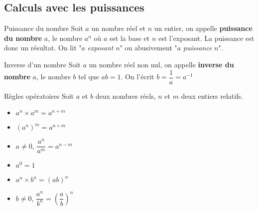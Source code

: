 \begin{pageCours} %


\section{Calculs avec les puissances}

\begin{DefT}{Puissance du nombre}
Soit $a$ un nombre réel et $n$ un entier, on appelle \textbf{puissance du nombre} $a$, le nombre $a^n$ où $a$ est la base et $n$ est l'exposant. La puissance est donc un résultat. On lit "$a$ \textit{exposant} $n$" ou abusivement "$a$ \textit{puissance} $n$".
\end{DefT}


\begin{DefT}{Inverse d'un nombre}
Soit $a$ un nombre réel non nul, on appelle \textbf{inverse du nombre} $a$, le nombre $b$ tel que $ab=1$. On l'écrit $b=\dfrac{1}{a}=a^{-1}$
\end{DefT}





\begin{ThT}{Règles opératoires}
Soit $a$ et $b$ deux nombres réels, $n$ et $m$ deux entiers relatifs.


\begin{minipage}{0.33\linewidth}
\begin{itemize}
\item $a^n \times a^m = a^{n+m}$ 
\item $\left(a^n \right)^m =a^{n\times m}$ 

\end{itemize}
\end{minipage}
\begin{minipage}{0.33\linewidth}
\begin{itemize}
\item $a \neq 0$, $\dfrac{a^n}{a^m} = a^{n-m} $ 
\item $a^0=1 $
 
\end{itemize}
\end{minipage}
\begin{minipage}{0.33\linewidth}
\begin{itemize}
\item $a^n \times b^n = (ab)^n$ 
\item $b \neq 0$, $\dfrac{a^n}{b^n} = \left( \dfrac{a}{b} \right)^n $ 
\end{itemize}
\end{minipage}


\end{ThT}
\end{pageCours}
